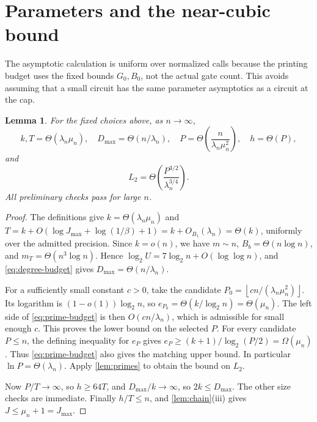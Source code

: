 \documentclass[11pt,letterpaper]{article}
\newtheorem{lemma}[theorem]{Lemma}
\theoremstyle{definition}
\theoremstyle{remark}
\newcommand{\floor}[1]{\left\lfloor #1\right\rfloor}
\newcommand{\lgx}{\log_2}
\begin{document}
\section{Parameters and the near-cubic bound}\label{sec:parameters}

The asymptotic calculation is uniform over normalized calls because
the printing budget uses the fixed bounds \(G_0,B_0\), not the
actual gate count. This avoids assuming that a small circuit has
the same parameter asymptotics as a circuit at the cap.

\begin{lemma}\label{lem:asymptotics}
For the fixed choices above, as \(n\to\infty\),
\[
 k,T=\Theta(\lambda_n\mu_n),\quad
 D_{\max}=\Theta(n/\lambda_n),\quad
 P=\Theta\!\left(\frac{n}{\lambda_n\mu_n^2}\right),\quad h=\Theta(P),
\]
and
\[
 L_2=\Theta\!\left(\frac{P^{3/2}}{\lambda_n^{3/4}}\right).
\]
All preliminary checks pass for large \(n\).
\end{lemma}
\begin{proof}
The definitions give \(k=\Theta(\lambda_n\mu_n)\) and
\(T=k+O(\log J_{\max}+\log(1/\beta)+1)
=k+O_{B_1}(\lambda_n)=\Theta(k)\), uniformly over the admitted precision.
Since \(k=o(n)\), we have \(m\sim n\),
\(B_b=\Theta(n\log n)\), and
\(m_T=\Theta(n^3\log n)\). Hence
\(\lgx U=7\lgx n+O(\log\log n)\), and
\eqref{eq:degree-budget} gives \(D_{\max}=\Theta(n/\lambda_n)\).

For a sufficiently small constant \(c>0\), take the candidate
\(P_0=\floor{cn/(\lambda_n\mu_n^2)}\).
Its logarithm is \((1-o(1))\lgx n\), so
\(e_{P_0}=\Theta(k/\lgx n)=\Theta(\mu_n)\).
The left side of \eqref{eq:prime-budget} is then
\(O(cn/\lambda_n)\), which is admissible for small enough \(c\).
This proves the lower bound on the selected \(P\).
For every candidate \(P\le n\), the defining inequality for \(e_P\)
gives \(e_P\ge(k+1)/\lgx(P/2)=\Omega(\mu_n)\).
Thus \eqref{eq:prime-budget} also gives the matching upper bound.
In particular \(\ln P=\Theta(\lambda_n)\).
Apply \cref{lem:primes} to obtain the bound on \(L_2\).

Now \(P/T\to\infty\), so \(h\ge64T\), and
\(D_{\max}/k\to\infty\), so \(2k\le D_{\max}\).
The other size checks are immediate. Finally \(h/T\le n\), and
\cref{lem:chain}(iii) gives \(J\le\mu_n+1=J_{\max}\).
\end{proof}
\end{document}
